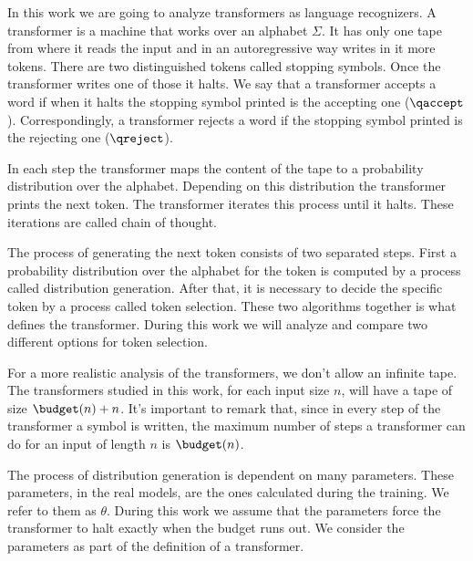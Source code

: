 

In this work we are going to analyze transformers as language recognizers.
A transformer is a machine that works over an alphabet $\Sigma$.
It has only one tape from where it reads the input and in an autoregressive way writes in it more tokens.
There are two distinguished tokens called stopping symbols.
Once the transformer writes one of those it halts.
We say that a transformer accepts a word if when it halts the stopping symbol printed is the accepting one ($\qaccept$).
Correspondingly, a transformer rejects a word if the stopping symbol printed is the rejecting one ($\qreject$).

In each step the transformer maps the content of the tape to a probability distribution over the alphabet.
Depending on this distribution the transformer prints the next token.
The transformer iterates this process until it halts.
These iterations are called chain of thought.

The process of generating the next token consists of two separated steps.
First a probability distribution over the alphabet for the token is computed by a process called distribution generation.
After that, it is necessary to decide the specific token by a process called token selection.
These two algorithms together is what defines the transformer.
During this work we will analyze and compare two different options for token selection.

For a more realistic analysis of the transformers, we don't allow an infinite tape.
The transformers studied in this work, for each input size $n$, will have a tape of size $\budget(n) + n$.
It's important to remark that, since in every step of the transformer a symbol is written, the maximum number of steps a transformer can do for an input of length $n$ is $\budget(n)$.


The process of distribution generation is dependent on many parameters.
These parameters, in the real models, are the ones calculated during the training.
We refer to them as $\theta$.
During this work we assume that the parameters force the transformer to halt exactly when the budget runs out. 
We consider the parameters as part of the definition of a transformer.






